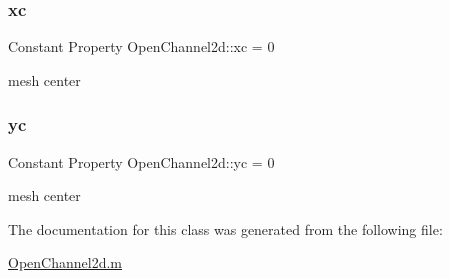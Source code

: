 \subsubsection{\texorpdfstring{xc}{xc}}
{\footnotesize\ttfamily Constant Property Open\+Channel2d\+::xc = 0}



mesh center 

\mbox{\label{class_open_channel2d_a6ce72cb1b50c3b3747ea4b86af2119bd}} 
\subsubsection{\texorpdfstring{yc}{yc}}
{\footnotesize\ttfamily Constant Property Open\+Channel2d\+::yc = 0}



mesh center 



The documentation for this class was generated from the following file\+:\begin{DoxyCompactItemize}
\item 
\hyperlink{_open_channel2d_8m}{Open\+Channel2d.\+m}\end{DoxyCompactItemize}
